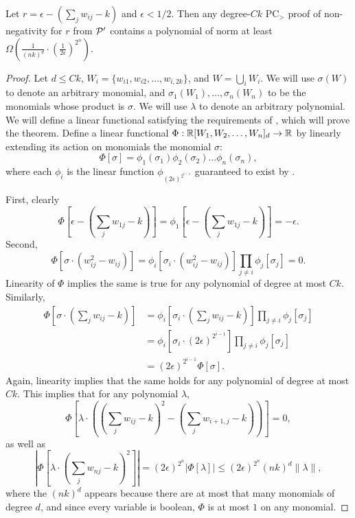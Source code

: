 \begin{lemma}\label{lem:boolean-complex}
Let $r = \epsilon - \left(\sum_j w_{ij} - k\right)$ and $\epsilon < 1/2$. Then any degree-$Ck$ PC$_>$ proof of non-negativity for $r$ from $\mathcal P'$ contains a polynomial of norm at least $\Omega\left(\frac{1}{(nk)^d} \cdot \left(\frac{1}{2\epsilon}\right)^{2^n}\right)$.
\end{lemma}
\begin{proof}
Let $d \leq Ck$, $W_i = \{w_{i1}, w_{i2}, \dots, w_{i,2k}\}$, and $W = \bigcup_i W_i$. We will use $\sigma(W)$ to denote an arbitrary monomial, and $\sigma_1(W_1),\dots,\sigma_n(W_n)$ to be the monomials whose product is $\sigma$. We will use $\lambda$ to denote an arbitrary polynomial. We will define a linear functional satisfying the requirements of , which will prove the theorem. Define a linear functional $\Phi: \mathbb R[W_1,W_2,\dots,W_n]_d \rightarrow \mathbb R$ by linearly extending its action on monomials the monomial $\sigma$:
\[\Phi[\sigma] = \phi_1(\sigma_1)\phi_2(\sigma_2)\dots\phi_n(\sigma_n),\]
where each $\phi_i$ is the linear function $\phi_{(2\epsilon)^{2^{i-1}}}$ guaranteed to exist by .

First, clearly 
\[\Phi\left[\epsilon - \left(\sum_j w_{1j} - k\right)\right] = \phi_1\left[\epsilon - \left(\sum_j w_{1j} - k\right)\right] = -\epsilon.\]
Second, 
\[\Phi\left[\sigma\cdot(w_{ij}^2 - w_{ij})\right] = \phi_i\left[\sigma_i\cdot (w_{ij}^2 - w_{ij})\right]\prod_{j \neq i}\phi_j[\sigma_j] = 0.\] 
Linearity of $\Phi$ implies the same is true for any polynomial of degree at most $Ck$. Similarly, 
\begin{align*}
\Phi\left[\sigma\cdot\left(\sum_j w_{ij} - k\right)\right] &= \phi_i\left[\sigma_i \cdot \left(\sum_j w_{ij} - k\right)\right]\prod_{j \neq i}\phi_j[\sigma_j] \\
&= \phi_i\left[\sigma_i \cdot (2\epsilon)^{2^{i-1}}\right] \prod_{j \neq i}\phi_j[\sigma_j] \\
&= (2\epsilon)^{2^{i-1}} \Phi[\sigma].
\end{align*}
Again, linearity implies that the same holds for any polynomial of degree at most $Ck$. This implies that for any polynomial $\lambda$, 
\[\Phi\left[\lambda\cdot \left((\sum_{j} w_{ij} - k)^2 - (\sum_j w_{i+1,j} - k)\right)\right] = 0,\]
as well as
\[\left|\Phi\left[\lambda \cdot \left(\sum_j w_{nj} - k\right)^2\right]\right| = (2\epsilon)^{2^n}\left|\Phi[\lambda]\right| \leq (2\epsilon)^{2^n}(nk)^d\|\lambda\|,\]
where the $(nk)^d$ appears because there are at most that many monomials of degree $d$, and since every variable is boolean, $\Phi$ is at most $1$ on any monomial. 


\end{proof}
